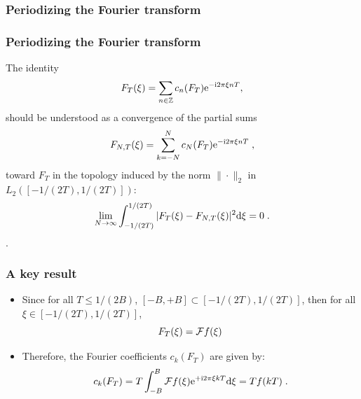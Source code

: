 \begin{frame}
\frametitle{Periodizing the Fourier transform}
\end{frame}

\begin{frame}
\frametitle{Periodizing the Fourier transform}
The identity
\begin{equation*}
F_T (\xi) = \sum_{n \in \mathbb{Z}} c_n(F_T) \mathrm{e}^{- \mathrm{i} 2 \pi \xi n T},
\end{equation*}
should be understood as a convergence of the partial sums
\begin{equation*}
F_{N,T}(\xi)= \sum_{k=-N}^N c_N(F_T) \mathrm{e}^{- \mathrm{i} 2 \pi \xi n T} \;,
\end{equation*}
toward $F_T$ in the topology induced by the norm $\|\cdot\|_2$  in $L_2([-1/(2T),1/(2T)])$:
$$
\lim_{N \to \infty} \int_{-1/(2T)}^{1/(2T)} |F_T(\xi) - F_{N,T}(\xi)|^2 \mathrm{d} \xi =0 \;.
$$
.
\end{frame}

\begin{frame}
\frametitle{A key result}
\begin{itemize}
\item Since for all $T \leq 1/(2B)$, $[-B,+B] \subset [-1/(2T), 1/(2T)]$, then for all $\xi \in [-1/(2T),1/(2T)]$,
\alert{
$$F_T(\xi) = \mathcal{F} f(\xi) $$
}
\item Therefore, the  Fourier coefficients $c_k(F_T)$ are given by:
\alert{
\begin{equation*}
c_k(F_T) = T \int_{-B}^{B} \mathcal{F} f(\xi) \mathrm{e}^{+ \mathrm{i} 2 \pi \xi k T} \mathrm{d} \xi= T f(kT)\;.
\end{equation*}
}
\end{itemize}
\end{frame}



